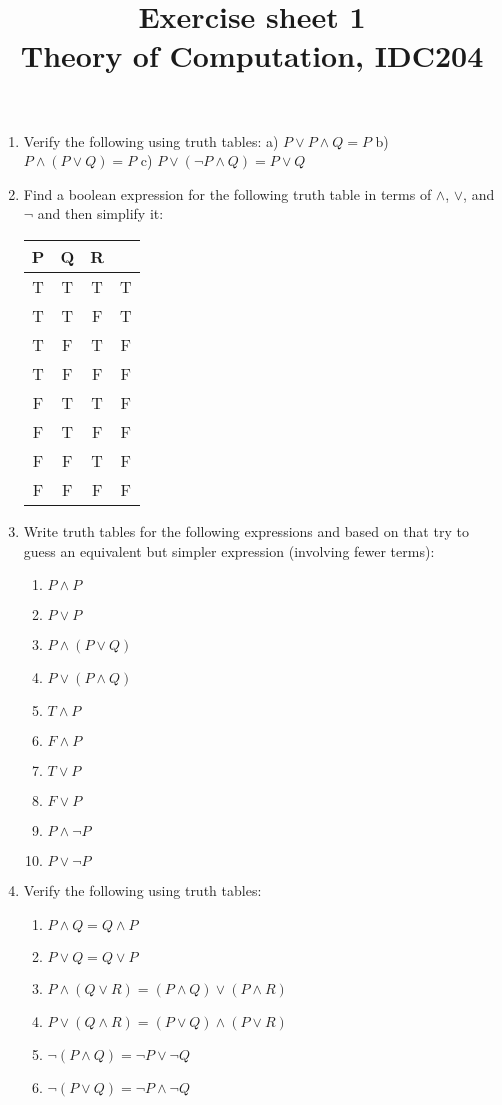 \documentclass[a4paper]{article}
\title{Exercise sheet 1\\ {\small Theory of Computation, IDC204} }
\date{}
\begin{document}
\maketitle
\begin{enumerate}
\item Verify the following using truth tables:
   a) $P \lor P \land Q = P$
   b) $P \land (P \lor Q) = P$
   c) $P \lor (\neg P \land Q) = P \lor Q$

\item Find a boolean expression for the following truth table in terms of $\land$, $\lor$, and $\neg$ and then simplify it:

  \begin{tabular}{|c|c|c|c|}
 P   & Q   & R   &   \\
    \hline
 T   & T   & T   & T \\
 T   & T   & F   & T \\
 T   & F   & T   & F \\
 T   & F   & F   & F \\
 F   & T   & T   & F \\
 F   & T   & F   & F \\
 F   & F   & T   & F \\
 F   & F   & F   & F \\
  \end{tabular}
  


\item Write truth tables for the following expressions and based on that try to guess an equivalent but simpler expression (involving fewer terms):
  \begin{enumerate}
   \item $P \land P$
   \item $P \lor P$
   \item $P \land (P \lor Q)$
   \item $P \lor (P \land Q)$
   \item $T \land P$
   \item $F \land P$
   \item $T \lor P$
   \item $F \lor P$
   \item $P \land \neg P$
   \item $P \lor \neg P$
  \end{enumerate}
   
\item Verify the following using truth tables:
  \begin{enumerate}
   \item $P \land Q = Q \land P$
   \item $P \lor Q = Q \lor P$
   \item $P \land (Q \lor R) = (P \land Q) \lor (P \land R)$
   \item $P \lor (Q \land R) = (P \lor Q) \land (P \lor R)$
   \item $\neg (P \land Q) = \neg P \lor \neg Q$
   \item $\neg (P \lor Q) = \neg P \land \neg Q$
  \end{enumerate}


\end{enumerate}
\end{document}
